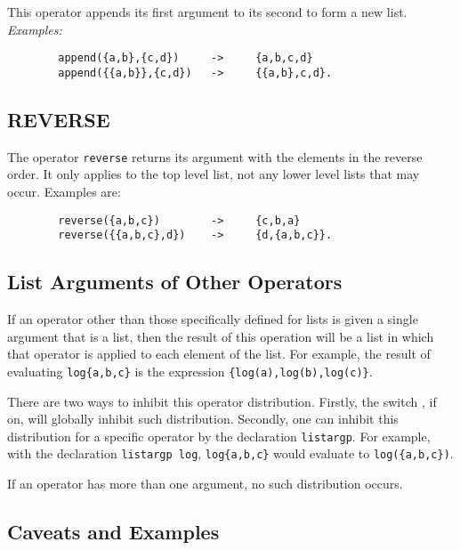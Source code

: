 This operator appends its first argument to its second to
form a new list.
\textit{Examples:}
\begin{verbatim}
        append({a,b},{c,d})     ->     {a,b,c,d}
        append({{a,b}},{c,d})   ->     {{a,b},c,d}.
\end{verbatim}

\subsection{REVERSE}
\hypertarget{operator:REVERSE}{}

The operator \texttt{reverse} returns its argument with the
elements in the reverse order.  It only applies to the top level list, not
any lower level lists that may occur.  Examples are:
\begin{verbatim}
        reverse({a,b,c})        ->     {c,b,a}
        reverse({{a,b,c},d})    ->     {d,{a,b,c}}.
\end{verbatim}

\subsection{List Arguments of Other Operators}
\hypertarget{switch:LISTARGS}{}
\hypertarget{command:LISTARGP}{}

If an operator other than those specifically defined for lists is given a
single argument that is a list, then the result of this operation will be
a list in which that operator is applied to each element of the list.  For
example, the result of evaluating \texttt{log\{a,b,c\}} is the expression
\texttt{\{log(a),log(b),log(c)\}}.

There are two ways to inhibit this operator distribution.  Firstly, the
switch , if on, will globally inhibit
such distribution.  Secondly, one can inhibit this distribution for a
specific operator by the declaration \texttt{listargp}. For
example, with the declaration \texttt{listargp log}, \texttt{log\{a,b,c\}}
 would evaluate to \texttt{log(\{a,b,c\})}.

If an operator has more than one argument, no such distribution occurs.

\subsection{Caveats and Examples}

